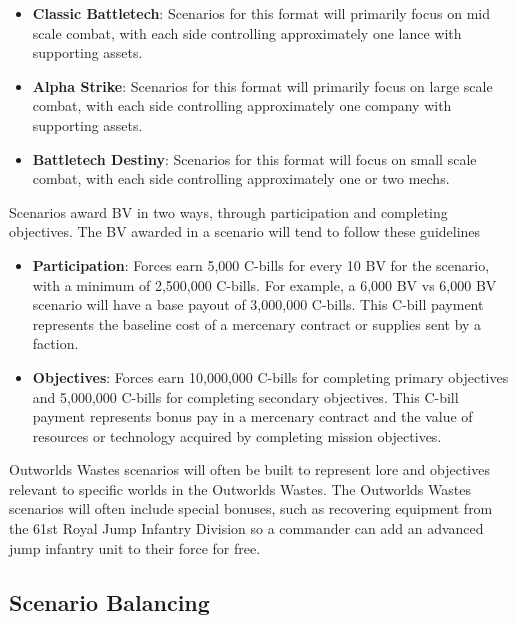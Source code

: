 \documentclass[UTF8]{article}
\begin{document}
\begin{itemize}

\item {\bf Classic Battletech}: Scenarios for this format will primarily focus on mid scale combat, with each side controlling approximately one lance with supporting assets.

\item {\bf Alpha Strike}: Scenarios for this format will primarily focus on large scale combat, with each side controlling approximately one company with supporting assets.

\item {\bf Battletech Destiny}: Scenarios for this format will focus on small scale combat, with each side controlling approximately one or two mechs.

\end{itemize}

Scenarios award BV in two ways, through participation and completing objectives.
The BV awarded in a scenario will tend to follow these guidelines

\begin{itemize}

\item {\bf Participation}: Forces earn 5,000 C-bills for every 10 BV for the scenario, with a minimum of 2,500,000 C-bills.
For example, a 6,000 BV vs 6,000 BV scenario will have a base payout of 3,000,000 C-bills.
This C-bill payment represents the baseline cost of a mercenary contract or supplies sent by a faction.

\item {\bf Objectives}: Forces earn 10,000,000 C-bills for completing primary objectives and 5,000,000 C-bills for completing secondary objectives.
This C-bill payment represents bonus pay in a mercenary contract and the value of resources or technology acquired by completing mission objectives.

\end{itemize}

Outworlds Wastes scenarios will often be built to represent lore and objectives relevant to specific worlds in the Outworlds Wastes.
The Outworlds Wastes scenarios will often include special bonuses, such as recovering equipment from the 61st Royal Jump Infantry Division so a commander can add an advanced jump infantry unit to their force for free.\\

\subsection{Scenario Balancing}
\end{document}
